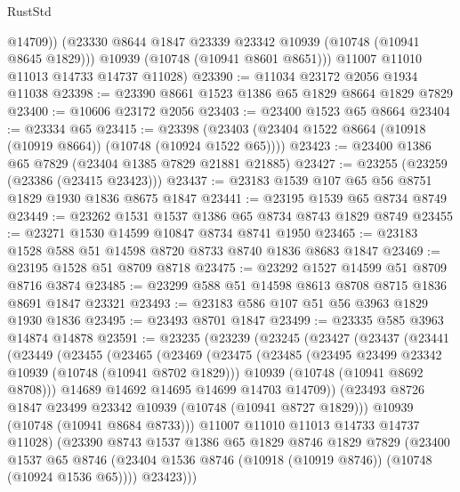 \begin{lexlean}{RustStd}
\begin{coremodule}
            @14709))
        (@23330 @8644 @1847 @23339 @23342 @10939 (@10748 (@10941 @8645 @1829)))
        @10939
        (@10748 (@10941 @8601 @8651)))
      @11007
      @11010
      @11013
      @14733
      @14737
      @11028)
@23390 := @11034 @23172 @2056 @1934 @11038
@23398 := @23390 @8661 @1523 @1386 @65 @1829 @8664 @1829 @7829
@23400 := @10606 @23172 @2056
@23403 := @23400 @1523 @65 @8664
@23404 := @23334 @65
@23415 := @23398 (@23403 (@23404 @1522 @8664 (@10918 (@10919 @8664)) (@10748 (@10924 @1522 @65))))
@23423 := @23400 @1386 @65 @7829 (@23404 @1385 @7829 @21881 @21885)
@23427 := @23255 (@23259 (@23386 (@23415 @23423)))
@23437 := @23183 @1539 @107 @65 @56 @8751 @1829 @1930 @1836 @8675 @1847
@23441 := @23195 @1539 @65 @8734 @8749
@23449 := @23262 @1531 @1537 @1386 @65 @8734 @8743 @1829 @8749
@23455 := @23271 @1530 @14599 @10847 @8734 @8741 @1950
@23465 := @23183 @1528 @588 @51 @14598 @8720 @8733 @8740 @1836 @8683 @1847
@23469 := @23195 @1528 @51 @8709 @8718
@23475 := @23292 @1527 @14599 @51 @8709 @8716 @3874
@23485 := @23299 @588 @51 @14598 @8613 @8708 @8715 @1836 @8691 @1847 @23321
@23493 := @23183 @586 @107 @51 @56 @3963 @1829 @1930 @1836
@23495 := @23493 @8701 @1847
@23499 := @23335 @585 @3963 @14874 @14878
@23591 := @23235
    (@23239
      (@23245
        (@23427
          (@23437
            (@23441
              (@23449
                (@23455
                  (@23465
                    (@23469
                      (@23475
                        (@23485
                          (@23495 @23499 @23342 @10939 (@10748 (@10941 @8702 @1829)))
                          @10939
                          (@10748 (@10941 @8692 @8708)))
                        @14689
                        @14692
                        @14695
                        @14699
                        @14703
                        @14709))
                    (@23493 @8726 @1847 @23499 @23342 @10939 (@10748 (@10941 @8727 @1829)))
                    @10939
                    (@10748 (@10941 @8684 @8733)))
                  @11007
                  @11010
                  @11013
                  @14733
                  @14737
                  @11028)
                (@23390
                  @8743
                  @1537
                  @1386
                  @65
                  @1829
                  @8746
                  @1829
                  @7829
                  (@23400
                    @1537
                    @65
                    @8746
                    (@23404 @1536 @8746 (@10918 (@10919 @8746)) (@10748 (@10924 @1536 @65))))
                  @23423)))

\end{coremodule}
\end{lexlean}
